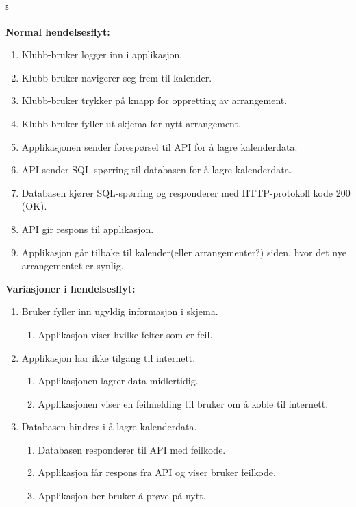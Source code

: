 ⁵\documentclass[norsk]{article}
\begin{document}
        \textbf{Normal hendelsesflyt:}
        \begin{enumerate}
            \item Klubb-bruker logger inn i applikasjon.
            \item Klubb-bruker navigerer seg frem til kalender.
            \item Klubb-bruker trykker på knapp for oppretting av arrangement.
            \item \label{itm:1A} Klubb-bruker fyller ut skjema for nytt arrangement.
            \item \label{itm:1B} Applikasjonen  sender forespørsel til API for å lagre kalenderdata.
            \item API sender SQL-spørring til databasen for å lagre kalenderdata.
            \item \label{itm:1C} Databasen kjører SQL-spørring og responderer med HTTP-protokoll kode 200 (OK).
            \item API gir respons til applikasjon.
            \item Applikasjon går tilbake til kalender(eller arrangementer?) siden, hvor det nye arrangementet er synlig.
            \newline
        \end{enumerate}
        
        \textbf{Variasjoner i hendelsesflyt:}
        
        \begin{enumerate}[start={\getrefnumber{itm:1A}}]
            \item Bruker fyller inn ugyldig informasjon i skjema.
                \begin{enumerate}
                    \item Applikasjon viser hvilke felter som er feil.
                \end{enumerate}
            \item Applikasjon har ikke tilgang til internett.
                \begin{enumerate}
                    \item Applikasjonen lagrer data midlertidig.
                    \item Applikasjonen viser en feilmelding til bruker om å koble til internett.
                \end{enumerate}
            \item Databasen hindres i å lagre kalenderdata.
                \begin{enumerate}
                    \item Databasen responderer til API med feilkode.
                    \item Applikasjon får respons fra API og viser bruker feilkode.
                    \item Applikasjon ber bruker å prøve på nytt.
                \end{enumerate}
        \end{enumerate}
\end{document}
